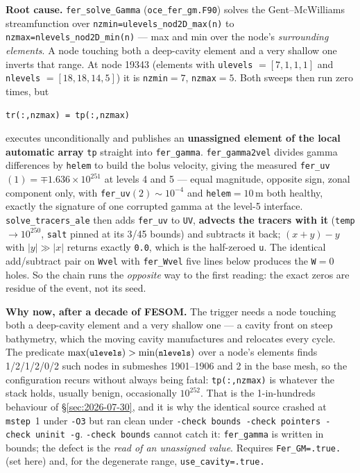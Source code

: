 \documentclass[11pt,a4paper]{article}
\newcommand{\code}[1]{\texttt{\small #1}}
\begin{document}
\textbf{Root cause.} \code{fer\_solve\_Gamma} (\code{oce\_fer\_gm.F90}) solves the Gent--McWilliams
streamfunction over \code{nzmin=ulevels\_nod2D\_max(n)} to \code{nzmax=nlevels\_nod2D\_min(n)} --- max
and min over the node's \emph{surrounding elements}. A node touching both a deep-cavity element and a
very shallow one inverts that range. At node 19343 (elements with \code{ulevels} $=[7,1,1,1]$ and
\code{nlevels} $=[18,18,14,5]$) it is \code{nzmin}$=7$, \code{nzmax}$=5$. Both sweeps then run zero
times, but
\begin{center}\code{tr(:,nzmax) = tp(:,nzmax)}\end{center}
executes unconditionally and publishes an \textbf{unassigned element of the local automatic array}
\code{tp} straight into \code{fer\_gamma}. \code{fer\_gamma2vel} divides gamma differences by
\code{helem} to build the bolus velocity, giving the measured
\code{fer\_uv}$(1)=\mp1.636\times10^{251}$ at levels 4 and 5 --- equal magnitude, opposite sign, zonal
component only, with \code{fer\_uv}$(2)\sim10^{-4}$ and \code{helem}$=10$\,m both healthy, exactly the
signature of one corrupted gamma at the level-5 interface. \code{solve\_tracers\_ale} then adds
\code{fer\_uv} to \code{UV}, \textbf{advects the tracers with it} (\code{temp}$\to10^{250}$, \code{salt}
pinned at its 3/45 bounds) and subtracts it back; $(x+y)-y$ with $|y|\gg|x|$ returns exactly \code{0.0},
which is the half-zeroed \code{u}. The identical add/subtract pair on \code{Wvel} with \code{fer\_Wvel}
five lines below produces the \code{W}$=0$ holes. So the chain runs the \emph{opposite} way to the
first reading: the exact zeros are residue of the event, not its seed.

\textbf{Why now, after a decade of FESOM.} The trigger needs a node touching both a deep-cavity element
and a very shallow one --- a cavity front on steep bathymetry, which the moving cavity manufactures and
relocates every cycle. The predicate
$\max(\code{ulevels})>\min(\code{nlevels})$ over a node's elements finds
1/2/1/2/0/2 such nodes in submeshes 1901--1906 and 2 in the base mesh, so the configuration recurs
without always being fatal: \code{tp(:,nzmax)} is whatever the stack holds, usually benign, occasionally
$10^{252}$. That is the 1-in-hundreds behaviour of \S\ref{sec:2026-07-30}, and it is why the identical
source crashed at \code{mstep}~1 under \code{-O3} but ran clean under
\code{-check bounds -check pointers -check uninit -g}. \code{-check bounds} cannot catch it:
\code{fer\_gamma} is written in bounds; the defect is the \emph{read of an unassigned value}. Requires
\code{Fer\_GM=.true.} (set here) and, for the degenerate range, \code{use\_cavity=.true.}
\end{document}
